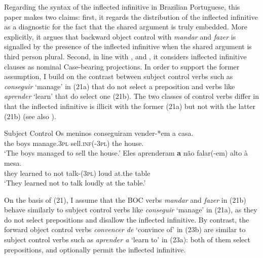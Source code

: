 \documentclass[output=paper]{langsci/langscibook}
\begin{document}
Regarding the syntax of the inflected infinitive in Brazilian Portuguese, this paper makes two claims: first, it regards the distribution of the inflected infinitive as a diagnostic for the fact that the shared argument is truly embedded. More explicitly, it argues that backward object control with \textit{mandar} and \textit{fazer} is signalled by the presence of the inflected infinitive when the shared argument is third person plural. Second, in line with \citet{Raposo1987}, \citet{Nunes1995} and \citet{Pires2010}, it considers inflected infinitive clauses as nominal Case-bearing projections. In order to support the former assumption, I build on the contrast between subject control verbs such as \textit{conseguir} ‘manage’ in (21a) that do not select a preposition and verbs like \textit{aprender} ‘learn’ that do select one (21b). The two classes of control verbs differ in that the inflected infinitive is illicit with the former (21a) but not with the latter (21b) (see also \citealt{Modesto2010}). 

\ea%
         Subject Control\label{ex:moreno:21}
    \ea  
    \gll Os meninos conseguiram   vender-*em   a casa.  \\
         the boys      manage.\textsc{3pl}    sell\textsc{.inf(-3pl)}  the house.\\
    \glt ‘The boys managed to sell the house.’
    \ex  
    \gll Eles    aprenderam \textbf{a}  não   falar(-em)     alto  à        mesa.     \\
         they    learned        to not    talk-(\textsc{3pl})  loud at.the table  \\
    \glt ‘They learned not to talk loudly at the table.’
    \z
\z

On the basis of (21), I assume that the BOC verbs \textit{mandar} and \textit{fazer} in (21b) behave similarly to subject control verbs like \textit{conseguir} ‘manage’ in (21a), as they do not select prepositions and disallow the inflected infinitive. By contrast, the forward object control verbs \textit{convencer de} ‘convince of’ in (23b) are similar to subject control verbs such as \textit{aprender a} ‘learn to’ in (23a): both of them select prepositions, and optionally permit the inflected infinitive.
\end{document}
